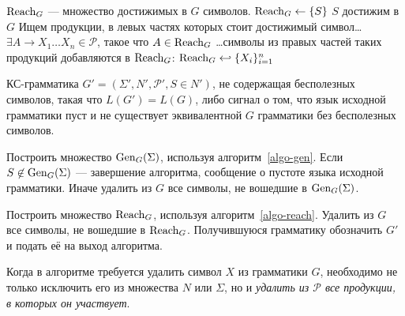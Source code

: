 \newcommand{\GenGS}{\ensuremath{\Gen_G(\Sigma)}}

{$\operatorname{Reach}_G$  — множество достижимых в $G$ символов.}
{%
\li $\operatorname{Reach}_G \gets \{ S \}$ \Comment $S$ достижим в $G$
\zi\Comment Ищем продукции, в левых частях которых стоит достижимый символ\ldots
\li \While $\exists A \to X_1 \ldots X_n \in \mathcal P$, такое что
    $A \in \operatorname{Reach}_G$
\zi \Comment \ldots символы из правых частей таких продукций добавляются
в $\operatorname{Reach}_G$:
\zi     \Do
        $\operatorname{Reach}_G \hookleftarrow \{ X_i \}_{i=1}^n$
        \End
    \End
}

{КС-грамматика $G'=(\Sigma', N', \mathcal P', S \in N')$, не
содержащая бесполезных символов, такая что $L(G') = L(G)$, либо сигнал о том,
что язык исходной грамматики пуст и не существует эквивалентной $G$
грамматики без бесполезных символов.}
{
  \item Построить множество \GenGS, используя алгоритм~\ref{algo-gen}. Если
  $S \not \in \GenGS$ — завершение алгоритма, сообщение о пустоте языка исходной
  грамматики. Иначе удалить из $G$ все символы, не вошедшие в \GenGS.
  \item Построить множество $\operatorname{Reach}_G$, используя алгоритм~\ref{algo-reach}.
  Удалить из $G$ все символы, не вошедшие в $\operatorname{Reach}_G$. Получившуюся грамматику
  обозначить $G'$ и подать её на выход алгоритма.
}

\begin{myremark}
Когда в алгоритме требуется удалить символ $X$ из грамматики $G$, необходимо
не только исключить его из множества $N$ или $\Sigma$, но и \emph{удалить из
$\mathcal P$ все продукции, в которых он участвует}.
\end{myremark}

